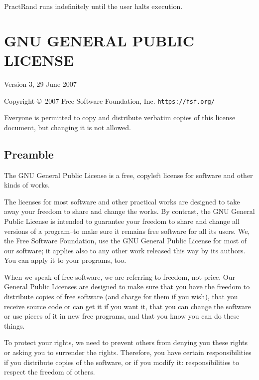\documentclass{article}
\begin{document}
PractRand runs indefinitely until the user halts execution.





\newpage
\section{GNU GENERAL PUBLIC LICENSE}

\begin{center}
{\parindent 0in

Version 3, 29 June 2007

\bigskip
Copyright \copyright\  2007 Free Software Foundation, Inc. \texttt{https://fsf.org/}

\bigskip
Everyone is permitted to copy and distribute verbatim copies of this
license document, but changing it is not allowed.}

\end{center}

\subsection{Preamble}
The GNU General Public License is a free, copyleft license for software and other kinds of works.

The licenses for most software and other practical works are designed to take away your freedom to share and change the works.  By contrast, the GNU General Public License is intended to guarantee your freedom to share and change all versions of a program--to make sure it remains free software for all its users.  We, the Free Software Foundation, use the GNU General Public License for most of our software; it applies also to any other work released this way by its authors.  You can apply it to your programs, too.

When we speak of free software, we are referring to freedom, not price.  Our General Public Licenses are designed to make sure that you have the freedom to distribute copies of free software (and charge for them if you wish), that you receive source code or can get it if you want it, that you can change the software or use pieces of it in new free programs, and that you know you can do these things.

To protect your rights, we need to prevent others from denying you these rights or asking you to surrender the rights.  Therefore, you have certain responsibilities if you distribute copies of the software, or if you modify it: responsibilities to respect the freedom of others.
\end{document}
